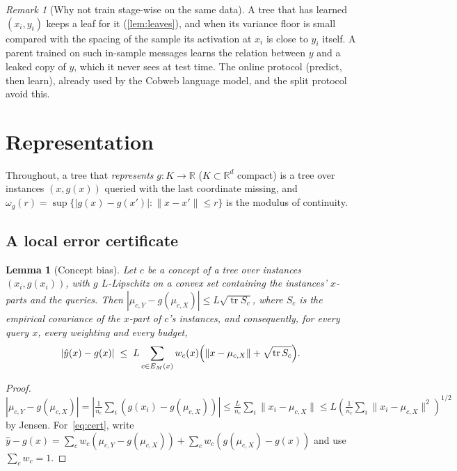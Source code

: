\documentclass[11pt]{article}
\newtheorem{lemma}[theorem]{Lemma}
\theoremstyle{definition}
\theoremstyle{remark}
\newtheorem{remark}[theorem]{Remark}
\newcommand{\R}{\mathbb{R}}
\newcommand{\hy}{\hat{y}}
\newcommand{\tr}{\operatorname{tr}}
\begin{document}
\begin{remark}[Why not train stage-wise on the same data]
A tree that has learned $(x_i,y_i)$ keeps a leaf for it (\cref{lem:leaves}), and when
its variance floor is small compared with the spacing of the sample its activation at
$x_i$ is close to $y_i$ itself.  A parent trained on such in-sample
messages learns the relation between $y$ and a leaked copy of $y$, which it never sees at
test time.  The online protocol (predict, then learn), already used by the Cobweb
language model, and the split protocol avoid this.
\end{remark}

\section{Representation}\label{sec:repr}

Throughout, a tree that \emph{represents} $g:K\to\R$ ($K\subset\R^d$ compact) is a tree
over instances $(x,g(x))$ queried with the last coordinate missing, and
$\omega_g(r)=\sup\{|g(x)-g(x')|:\|x-x'\|\le r\}$ is the modulus of continuity.

\subsection{A local error certificate}

\begin{lemma}[Concept bias]\label{lem:bias}
Let $c$ be a concept of a tree over instances $(x_i,g(x_i))$, with $g$ $L$-Lipschitz on a
convex set containing the instances' $x$-parts and the queries.
Then $|\mu_{c,Y}-g(\mu_{c,X})|\le L\sqrt{\tr S_c}$, where $S_c$ is the empirical
covariance of the $x$-part of $c$'s instances, and consequently, for every query $x$,
every weighting and every budget,
\begin{equation}\label{eq:cert}
  |\hy(x)-g(x)|\;\le\;L\sum_{c\in E_M(x)}w_c(x)\Bigl(\|x-\mu_{c,X}\|+\sqrt{\tr S_c}\Bigr).
\end{equation}
\end{lemma}
\begin{proof}
$|\mu_{c,Y}-g(\mu_{c,X})|=|\tfrac{1}{n_c}\sum_i(g(x_i)-g(\mu_{c,X}))|\le
\tfrac{L}{n_c}\sum_i\|x_i-\mu_{c,X}\|\le L(\tfrac1{n_c}\sum_i\|x_i-\mu_{c,X}\|^2)^{1/2}$
by Jensen.  For~\eqref{eq:cert}, write $\hy-g(x)=\sum_c w_c(\mu_{c,Y}-g(\mu_{c,X}))+
\sum_c w_c(g(\mu_{c,X})-g(x))$ and use $\sum_cw_c=1$.
\end{proof}
\end{document}

